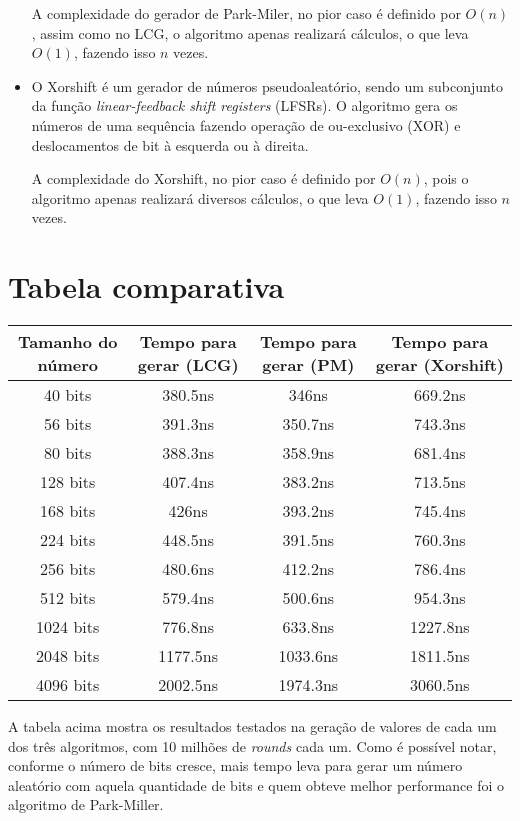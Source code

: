 \documentclass{article}
\begin{document}
\begin{itemize}
        A complexidade do gerador de Park-Miler, no pior caso é definido por
            $O(n)$, assim como no LCG, o algoritmo apenas realizará cálculos, o
            que leva $O(1)$, fazendo isso $n$ vezes.
        
        \item O Xorshift é um gerador de números pseudoaleatório, sendo um
            subconjunto da função \textit{linear-feedback shift registers}
            (LFSRs). O algoritmo gera os números de uma sequência fazendo
            operação de ou-exclusivo (XOR) e deslocamentos de bit à esquerda ou
            à direita.
        
        A complexidade do Xorshift, no pior caso é definido por $O(n)$, pois o
            algoritmo apenas realizará diversos cálculos, o que leva $O(1)$,
            fazendo isso $n$ vezes.
    \end{itemize}

\section*{Tabela comparativa}
    \begin{center}
        \begin{tabular}{|c|c|c|c|}
             \hline
             Tamanho do número & Tempo para gerar (LCG) & Tempo para gerar (PM)
             & Tempo para gerar (Xorshift) \\
             \hline
             40 bits   & 380.5ns  & 346ns    & 669.2ns \\
             56 bits   & 391.3ns  & 350.7ns  & 743.3ns \\
             80 bits   & 388.3ns  & 358.9ns  & 681.4ns \\
             128 bits  & 407.4ns  & 383.2ns  & 713.5ns \\
             168 bits  & 426ns    & 393.2ns  & 745.4ns \\
             224 bits  & 448.5ns  & 391.5ns  & 760.3ns \\
             256 bits  & 480.6ns  & 412.2ns  & 786.4ns \\
             512 bits  & 579.4ns  & 500.6ns  & 954.3ns \\
             1024 bits & 776.8ns  & 633.8ns  & 1227.8ns \\
             2048 bits & 1177.5ns & 1033.6ns & 1811.5ns \\
             4096 bits & 2002.5ns & 1974.3ns & 3060.5ns \\
             \hline
        \end{tabular}
    \end{center}
    A tabela acima mostra os resultados testados na geração de valores de cada
    um dos três algoritmos, com 10 milhões de \textit{rounds} cada um. Como é
    possível notar, conforme o número de bits cresce, mais tempo leva para
    gerar um número aleatório com aquela quantidade de bits e quem obteve
    melhor performance foi o algoritmo de Park-Miller.
\end{document}
